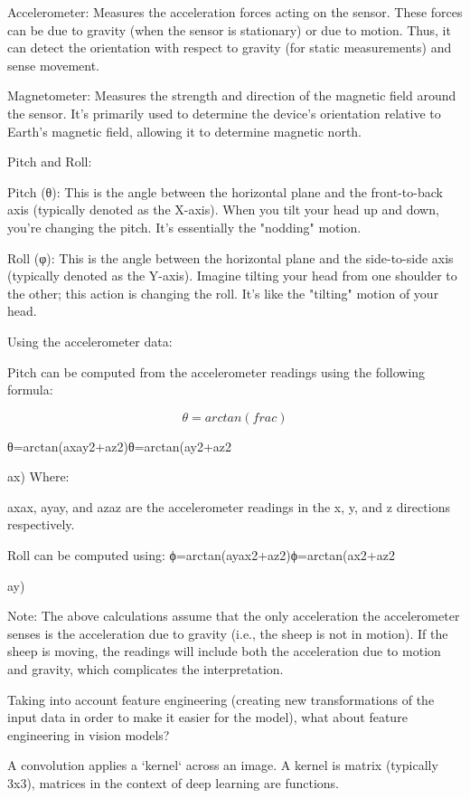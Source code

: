 Accelerometer: Measures the acceleration forces acting on the sensor. These forces can be due to gravity 
(when the sensor is stationary) or due to motion. 
Thus, it can detect the orientation with respect to gravity (for static measurements) and sense movement.

Magnetometer: Measures the strength and direction of the magnetic field around the sensor. 
It's primarily used to determine the device's orientation relative to Earth's magnetic field, allowing 
it to determine magnetic north.

Pitch and Roll:

    Pitch (θ): This is the angle between the horizontal plane and the front-to-back axis (typically 
    denoted as the X-axis). When you tilt your head up and down, you're changing the pitch. It's 
    essentially the "nodding" motion.

    Roll (φ): This is the angle between the horizontal plane and the side-to-side axis (typically 
    denoted as the Y-axis). Imagine tilting your head from one shoulder to the other; this 
    action is changing the roll. It's like the "tilting" motion of your head.

Using the accelerometer data:

Pitch can be computed from the accelerometer readings using the following formula:

$$
\theta = arctan(frac)
$$


θ=arctan⁡(axay2+az2)θ=arctan(ay2​+az2​

​ax​​)
Where:

axax​, ayay​, and azaz​ are the accelerometer readings in the x, y, and z directions respectively.

Roll can be computed using:
ϕ=arctan⁡(ayax2+az2)ϕ=arctan(ax2​+az2​

​ay​​)

Note: The above calculations assume that the only acceleration the accelerometer senses is the acceleration due to gravity (i.e., the sheep is not in motion). If the sheep is moving, the readings will include both the acceleration due to motion and gravity, which complicates the interpretation.




Taking into account feature engineering (creating new transformations of the input data in order
to make it easier for the model), what about feature engineering in vision models?




A convolution applies a `kernel` across an image. A kernel is matrix (typically 3x3), matrices in the context of deep learning are 
functions. 


